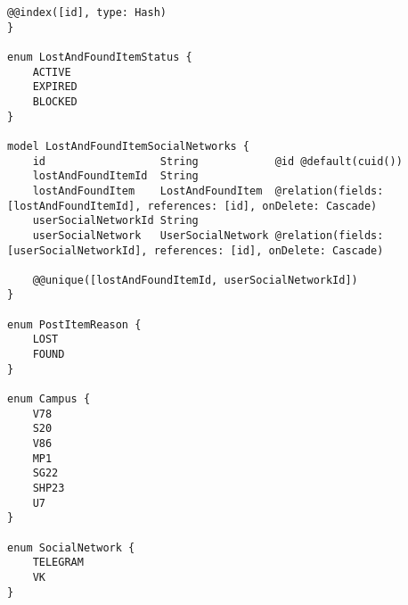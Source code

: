 \documentclass{mirea}
\begin{document}
\begin{lstlisting}[label=lst:factorial]
	@@index([id], type: Hash)
}

enum LostAndFoundItemStatus {
	ACTIVE
	EXPIRED
	BLOCKED
}

model LostAndFoundItemSocialNetworks {
	id                  String            @id @default(cuid())
	lostAndFoundItemId  String
	lostAndFoundItem    LostAndFoundItem  @relation(fields: [lostAndFoundItemId], references: [id], onDelete: Cascade)
	userSocialNetworkId String
	userSocialNetwork   UserSocialNetwork @relation(fields: [userSocialNetworkId], references: [id], onDelete: Cascade)
	
	@@unique([lostAndFoundItemId, userSocialNetworkId])
}

enum PostItemReason {
	LOST
	FOUND
}

enum Campus {
	V78
	S20
	V86
	MP1
	SG22
	SHP23
	U7
}

enum SocialNetwork {
	TELEGRAM
	VK
}
\end{lstlisting}
	
\end{document}
